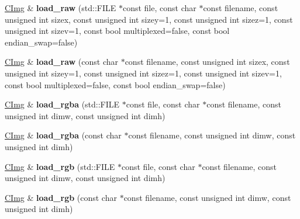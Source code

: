 \begin{DoxyCompactItemize}
\item 
\hypertarget{structcimg__library_1_1_c_img_ac18432a55ad280d361ee1c01f6b09e12}{\hyperlink{structcimg__library_1_1_c_img}{C\-Img} \& {\bfseries load\-\_\-raw} (std\-::\-F\-I\-L\-E $\ast$const file, const char $\ast$const filename, const unsigned int sizex, const unsigned int sizey=1, const unsigned int sizez=1, const unsigned int sizev=1, const bool multiplexed=false, const bool endian\-\_\-swap=false)}\label{structcimg__library_1_1_c_img_ac18432a55ad280d361ee1c01f6b09e12}

\item 
\hypertarget{structcimg__library_1_1_c_img_a0171ebf5428cdeb65d0cf5bdc38d4aef}{\hyperlink{structcimg__library_1_1_c_img}{C\-Img} \& {\bfseries load\-\_\-raw} (const char $\ast$const filename, const unsigned int sizex, const unsigned int sizey=1, const unsigned int sizez=1, const unsigned int sizev=1, const bool multiplexed=false, const bool endian\-\_\-swap=false)}\label{structcimg__library_1_1_c_img_a0171ebf5428cdeb65d0cf5bdc38d4aef}

\item 
\hypertarget{structcimg__library_1_1_c_img_a9e2cf5e1fef554bb0cff540e683662f3}{\hyperlink{structcimg__library_1_1_c_img}{C\-Img} \& {\bfseries load\-\_\-rgba} (std\-::\-F\-I\-L\-E $\ast$const file, const char $\ast$const filename, const unsigned int dimw, const unsigned int dimh)}\label{structcimg__library_1_1_c_img_a9e2cf5e1fef554bb0cff540e683662f3}

\item 
\hypertarget{structcimg__library_1_1_c_img_a541f2384cc851c5fb5777d173ac9fb47}{\hyperlink{structcimg__library_1_1_c_img}{C\-Img} \& {\bfseries load\-\_\-rgba} (const char $\ast$const filename, const unsigned int dimw, const unsigned int dimh)}\label{structcimg__library_1_1_c_img_a541f2384cc851c5fb5777d173ac9fb47}

\item 
\hypertarget{structcimg__library_1_1_c_img_a8af2bb2b31a1ccaf8b73f7cce7c37709}{\hyperlink{structcimg__library_1_1_c_img}{C\-Img} \& {\bfseries load\-\_\-rgb} (std\-::\-F\-I\-L\-E $\ast$const file, const char $\ast$const filename, const unsigned int dimw, const unsigned int dimh)}\label{structcimg__library_1_1_c_img_a8af2bb2b31a1ccaf8b73f7cce7c37709}

\item 
\hypertarget{structcimg__library_1_1_c_img_a830febfc2298d7a33503b77a7efcde59}{\hyperlink{structcimg__library_1_1_c_img}{C\-Img} \& {\bfseries load\-\_\-rgb} (const char $\ast$const filename, const unsigned int dimw, const unsigned int dimh)}\label{structcimg__library_1_1_c_img_a830febfc2298d7a33503b77a7efcde59}


\end{DoxyCompactItemize}
